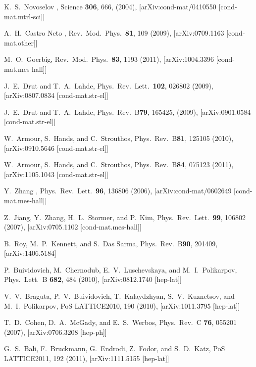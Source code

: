 \documentclass[aps,prd,twocolumn,showpacs,superscriptaddress,groupedaddress]{revtex4}  %
\begin{document}
\begin{thebibliography}{99}

K.~S.~Novoselov \etal, Science {\bf 306}, 666, (2004), [arXiv:cond-mat/0410550 [cond-mat.mtrl-sci]]

A.~H.~Castro Neto \etal, Rev.\ Mod.\ Phys.\ {\bf 81}, 109 (2009), [arXiv:0709.1163 [cond-mat.other]]

M.~O.~Goerbig, Rev.\ Mod.\ Phys.\ {\bf 83}, 1193  (2011), [arXiv:1004.3396 [cond-mat.mes-hall]]

J.~E.~Drut and T.~A.~Lahde, Phys.\ Rev.\ Lett.\ {\bf 102}, 026802 (2009), [arXiv:0807.0834 [cond-mat.str-el]]

J.~E.~Drut and T.~A.~Lahde, Phys.\ Rev.\ B{\bf79}, 165425, (2009), [arXiv:0901.0584 [cond-mat.str-el]]

W.~Armour, S.~Hands, and C.~Strouthos, Phys.\ Rev.\ B{\bf 81}, 125105 (2010), [arXiv:0910.5646 [cond-mat.str-el]]

W.~Armour, S.~Hands, and C.~Strouthos, Phys.\ Rev.\ B{\bf 84}, 075123 (2011), [arXiv:1105.1043 [cond-mat.str-el]]

Y.~Zhang \etal, Phys.\ Rev.\ Lett.\ {\bf 96}, 136806 (2006), [arXiv:cond-mat/0602649 [cond-mat.mes-hall]]

Z.~Jiang, Y.~Zhang, H.~L.~Stormer, and P.~Kim, Phys.\ Rev.\ Lett.\ {\bf 99}, 106802 (2007), [arXiv:0705.1102 [cond-mat.mes-hall]]

B.~Roy, M.~P.~Kennett, and S.~Das Sarma, Phys.\ Rev.\ B{\bf 90}, 201409, [arXiv:1406.5184]

P.~Buividovich, M.~Chernodub, E.~V.~Luschevskaya, and M.~I.~Polikarpov, Phys.\ Lett.\ B {\bf 682}, 484 (2010), [arXiv:0812.1740 [hep-lat]]

V.~V.~Braguta, P.~V.~Buividovich, T.~Kalaydzhyan, S.~V.~Kuznetsov, and M.~I.~Polikarpov, PoS LATTICE2010, 190 (2010), [arXiv:1011.3795 [hep-lat]]

T.~D.~Cohen, D.~A.~McGady, and E.~S.~Werbos, Phys.\ Rev.\ C {\bf 76}, 055201 (2007), [arXiv:0706.3208 [hep-ph]]

G.~S.~Bali, F.~Bruckmann, G.~Endrodi, Z.~Fodor, and S.~D.~Katz, PoS LATTICE2011, 192 (2011), [arXiv:1111.5155 [hep-lat]]



\end{thebibliography}
\end{document}
